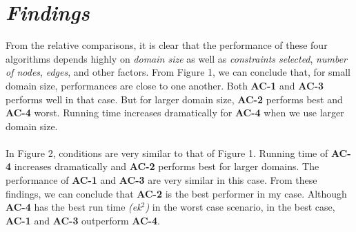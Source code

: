 \documentclass[12pt, english]{article}
\begin{document}
\section{\textit{Findings}}
\par
From the relative comparisons, it is clear that the performance of these four algorithms depends highly on \textit{domain size} as well as \textit{constraints selected}, \textit{number of nodes}, \textit{edges}, and other factors. From Figure 1, we can conclude that, for small domain size, performances are close to one another. Both \textbf{AC-1} and \textbf{AC-3} performs well in that case. But for larger domain size, \textbf{AC-2} performs best and \textbf{AC-4} worst. Running time increases dramatically for \textbf{AC-4} when we use larger domain size. \\\\
In Figure 2, conditions are very similar to that of Figure 1. Running time of \textbf{AC-4} increases dramatically and \textbf{AC-2} performs best for larger domains. The performance of \textbf{AC-1} and \textbf{AC-3} are very similar in this case. From these findings, we can conclude that \textbf{AC-2} is the best performer in my case. Although \textbf{AC-4} has the best run time \textit{(ek$^2$)} in the worst case scenario, in the best case, \textbf{AC-1} and \textbf{AC-3} outperform \textbf{AC-4}.
\end{document}
